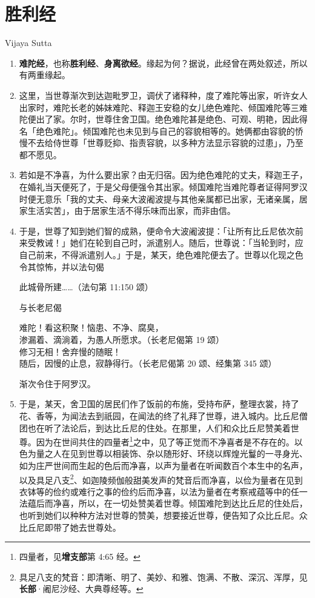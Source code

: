\section{胜利经}

\begin{center}Vijaya Sutta\end{center}\vspace{1em}

\begin{enumerate}\item \textbf{难陀经}，也称\textbf{胜利经}、\textbf{身离欲经}。缘起为何？据说，此经曾在两处叙述，所以有两重缘起。
\item 这里，当世尊渐次到达迦毗罗卫，调伏了诸释种，度了难陀等出家，听许女人出家时，难陀长老的姊妹难陀、释迦王安稳的女儿绝色难陀、倾国难陀等三难陀便出了家。尔时，世尊住舍卫国。绝色难陀甚是绝色、可观、明艳，因此得名「绝色难陀」。倾国难陀也未见到与自己的容貌相等的。她俩都由容貌的㤭慢不去给侍世尊「世尊贬抑、指责容貌，以多种方法显示容貌的过患」，乃至都不愿见。
\item 若如是不净喜，为什么要出家？由无归宿。因为绝色难陀的丈夫，释迦王子，在婚礼当天便死了，于是父母便强令其出家。倾国难陀当难陀尊者证得阿罗汉时便无意乐「我的丈夫、母亲大波阇波提与其他亲属都已出家，无诸亲属，居家生活实苦」，由于居家生活不得乐味而出家，而非由信。
\item 于是，世尊了知到她们智的成熟，便命令大波阇波提：「让所有比丘尼依次前来受教诫！」她们在轮到自己时，派遣别人。随后，世尊说：「当轮到时，应自己前来，不得派遣别人。」于是，某天，绝色难陀便去了。世尊以化现之色令其惊怖，并以法句偈\begin{quoting}此城骨所建……（法句第 11:150 颂）\end{quoting}与长老尼偈\begin{quoting}难陀！看这积聚！恼患、不净、腐臭，\\渗漏着、滴淌着，为愚人所愿求。（长老尼偈第 19 颂）\\修习无相！舍弃慢的随眠！\\随后，因慢的止息，寂静得行。（长老尼偈第 20 颂、经集第 345 颂）\end{quoting}渐次令住于阿罗汉。
\item 于是，某天，舍卫国的居民们作了饭前的布施，受持布萨，整理衣裳，持了花、香等，为闻法去到祇园，在闻法的终了礼拜了世尊，进入城内。比丘尼僧团也在听了法论后，到达比丘尼的住处。在那里，人们和众比丘尼赞美着世尊。因为在世间共住的四量者\footnote{四量者，见\textbf{增支部}第 4:65 经。}之中，见了等正觉而不净喜者是不存在的。以色为量之人在见到世尊以相装饰、杂以随形好、环绕以辉煌光鬘的一寻身光、如为庄严世间而生起的色后而净喜，以声为量者在听闻数百个本生中的名声，以及具足八支\footnote{具足八支的梵音：即清晰、明了、美妙、和雅、饱满、不散、深沉、浑厚，见\textbf{长部}·阇尼沙经、大典尊经等。}、如迦陵频伽般甜美发声的梵音后而净喜，以俭为量者在见到衣钵等的俭约或难行之事的俭约后而净喜，以法为量者在考察戒蕴等中的任一法蕴后而净喜，所以，在一切处赞美着世尊。倾国难陀到达比丘尼的住处后，也听到她们以种种方法对世尊的赞美，想要接近世尊，便告知了众比丘尼。众比丘尼即带了她去世尊处。

\end{enumerate}
